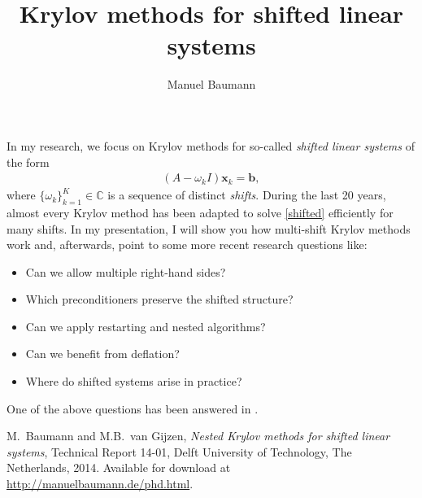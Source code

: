 \documentclass{article}
\title{Krylov methods for shifted linear systems}
\author{Manuel Baumann}
\affil{PhD student at TU Delft}
\date{}
\begin{document}
\maketitle
\setcounter{page}{5}
In my research, we focus on Krylov methods for so-called \textit{shifted linear systems} of the form
\begin{align}
\label{shifted}
 (A - \omega_k I) \mathbf{x}_k = \mathbf{b},
\end{align}
where $\{\omega_k\}_{k=1}^K \in \mathbb{C}$ is a sequence of distinct \textit{shifts}. During the last 20 years, almost every Krylov method has been adapted to solve \eqref{shifted} efficiently for many shifts. In my presentation, I will show you how multi-shift Krylov methods work and, afterwards, point to some more recent research questions like:
\begin{itemize}
 \item Can we allow multiple right-hand sides?
 \item Which preconditioners preserve the shifted structure?
 \item Can we apply restarting and nested algorithms?
 \item Can we benefit from deflation?
 \item Where do shifted systems arise in practice?
\end{itemize}

\noindent One of the above questions has been answered in \cite{BG14}.

\begin{thebibliography}{10}
{\sc M.~Baumann and M.B.~van Gijzen}, {\em {N}ested {K}rylov methods for shifted linear systems}, Technical Report 14-01, Delft University of Technology, The Netherlands, 2014.
\newblock Available for download at \href{http://manuelbaumann.de/phd.html}{http://manuelbaumann.de/phd.html}.
\end{thebibliography}
\end{document}
